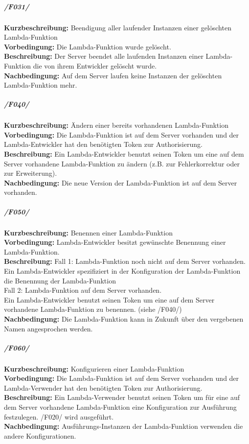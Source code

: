 \documentclass[a4paper,20pt,oneside]{book}
\begin{document}
\subparagraph{/F031/}
\textbf{Kurzbeschreibung:} Beendigung aller laufender Instanzen einer gelöschten \Gls{Lambda-Funktion}
\\
\textbf{Vorbedingung:} Die \Gls{Lambda-Funktion} wurde gelöscht.
\\
\textbf{Beschreibung:} Der \Gls{Server} beendet alle laufenden Instanzen einer \Gls{Lambda-Funktion} die von ihrem Entwickler gelöscht wurde.
\\
\textbf{Nachbedingung:} Auf dem \Gls{Server} laufen keine Instanzen der gelöschten \Gls{Lambda-Funktion} mehr.

\subparagraph{/F040/}
\textbf{Kurzbeschreibung:} Ändern einer bereits vorhandenen \Gls{Lambda-Funktion}
\\
\textbf{Vorbedingung:} Die \Gls{Lambda-Funktion} ist auf dem \Gls{Server} vorhanden und der \Gls{Lambda-Entwickler} hat den benötigten \Gls{Token} zur Authorisierung.
\\
\textbf{Beschreibung:} Ein \Gls{Lambda-Entwickler} benutzt seinen \Gls{Token} um eine auf dem \Gls{Server} vorhandene \Gls{Lambda-Funktion} zu ändern (z.B. zur Fehlerkorrektur oder zur Erweiterung).
\\
\textbf{Nachbedingung:} Die neue Version der \Gls{Lambda-Funktion} ist auf dem \Gls{Server} vorhanden.

\pagebreak

\subparagraph{/F050/}
\textbf{Kurzbeschreibung:} Benennen einer \Gls{Lambda-Funktion}
\\
\textbf{Vorbedingung:} \Gls{Lambda-Entwickler} besitzt gewünschte Benennung einer \Gls{Lambda-Funktion}.
\\
\textbf{Beschreibung:}
Fall 1: \Gls{Lambda-Funktion} noch nicht auf dem \gls{Server} vorhanden.\\
Ein \Gls{Lambda-Entwickler} spezifiziert in der Konfiguration der \Gls{Lambda-Funktion} die Benennung der \gls{Lambda-Funktion}\\
Fall 2: \Gls{Lambda-Funktion} auf dem \gls{Server} vorhanden.\\
Ein \Gls{Lambda-Entwickler} benutzt seinen \Gls{Token} um eine auf dem \Gls{Server} vorhandene \Gls{Lambda-Funktion} zu benennen. (siehe /F040/)
\\
\textbf{Nachbedingung:} Die \Gls{Lambda-Funktion} kann in Zukunft über den vergebenen Namen angesprochen werden.

\subparagraph{/F060/}
\textbf{Kurzbeschreibung:} Konfigurieren einer \Gls{Lambda-Funktion}
\\
\textbf{Vorbedingung:} Die \Gls{Lambda-Funktion} ist auf dem \Gls{Server} vorhanden und der \Gls{Lambda-Verwender} hat den benötigten \Gls{Token} zur Authorisierung.
\\
\textbf{Beschreibung:} Ein \Gls{Lambda-Verwender} benutzt seinen \Gls{Token} um für eine auf dem \Gls{Server} vorhandene \Gls{Lambda-Funktion} eine \Gls{Konfiguration} zur Ausführung festzulegen. /F020/ wird ausgeführt.
\\
\textbf{Nachbedingung:} Ausführungs-Instanzen der \Gls{Lambda-Funktion} verwenden die andere Konfigurationen.
\end{document}
